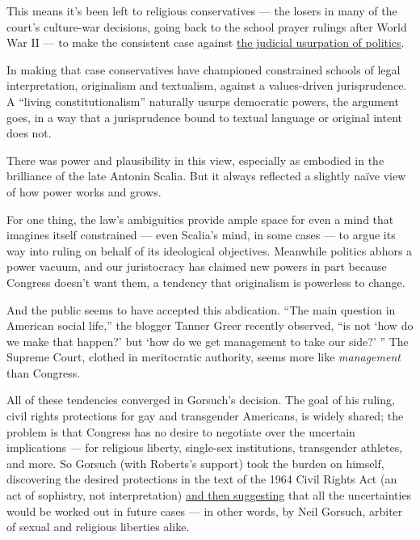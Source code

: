 This means it's been left to religious conservatives --- the losers in
many of the court's culture-war decisions, going back to the school
prayer rulings after World War II --- to make the consistent case
against
\href{https://www.firstthings.com/article/1996/11/the-end-of-democracy-the-judicial-usurpation-of-politics}{the
judicial usurpation of politics}.

In making that case conservatives have championed constrained schools of
legal interpretation, originalism and textualism, against a
values-driven jurisprudence. A ``living constitutionalism'' naturally
usurps democratic powers, the argument goes, in a way that a
jurisprudence bound to textual language or original intent does not.

There was power and plausibility in this view, especially as embodied in
the brilliance of the late Antonin Scalia. But it always reflected a
slightly naïve view of how power works and grows.

For one thing, the law's ambiguities provide ample space for even a mind
that imagines itself constrained --- even Scalia's mind, in some cases
--- to argue its way into ruling on behalf of its ideological
objectives. Meanwhile politics abhors a power vacuum, and our
juristocracy has claimed new powers in part because Congress doesn't
want them, a tendency that originalism is powerless to change.

And the public seems to have accepted this abdication. ``The main
question in American social life,'' the blogger Tanner Greer recently
observed, ``is not `how do we make that happen?' but `how do we get
management to take our side?' '' The Supreme Court, clothed in
meritocratic authority, seems more like \emph{management} than Congress.

All of these tendencies converged in Gorsuch's decision. The goal of his
ruling, civil rights protections for gay and transgender Americans, is
widely shared; the problem is that Congress has no desire to negotiate
over the uncertain implications --- for religious liberty, single-sex
institutions, transgender athletes, and more. So Gorsuch (with Roberts's
support) took the burden on himself, discovering the desired protections
in the text of the 1964 Civil Rights Act (an act of sophistry, not
interpretation)
\href{https://www.nationalreview.com/2020/06/what-are-the-adverse-consequences-of-gorsuchs-bostock-ruling/}{and
then suggesting} that all the uncertainties would be worked out in
future cases --- in other words, by Neil Gorsuch, arbiter of sexual and
religious liberties alike.

